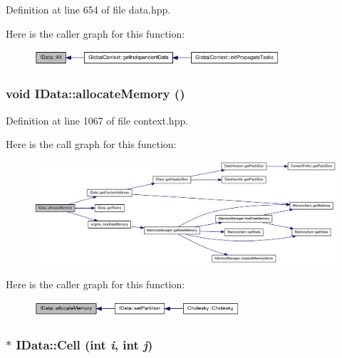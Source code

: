 Definition at line 654 of file data.hpp.

Here is the caller graph for this function:\nopagebreak
\begin{figure}[H]
\begin{center}
\leavevmode
\includegraphics[width=259pt]{class_i_data_aee2a0f1d0d749dc8a2380e4ae5e84c62_icgraph}
\end{center}
\end{figure}
\hypertarget{class_i_data_aa3f5c7ae906943db0780856ba3d53a33}{
\subsubsection[{allocateMemory}]{\setlength{\rightskip}{0pt plus 5cm}void IData::allocateMemory ()}}
\label{class_i_data_aa3f5c7ae906943db0780856ba3d53a33}


Definition at line 1067 of file context.hpp.

Here is the call graph for this function:\nopagebreak
\begin{figure}[H]
\begin{center}
\leavevmode
\includegraphics[width=420pt]{class_i_data_aa3f5c7ae906943db0780856ba3d53a33_cgraph}
\end{center}
\end{figure}


Here is the caller graph for this function:\nopagebreak
\begin{figure}[H]
\begin{center}
\leavevmode
\includegraphics[width=217pt]{class_i_data_aa3f5c7ae906943db0780856ba3d53a33_icgraph}
\end{center}
\end{figure}
\hypertarget{class_i_data_a01298b83fbbb3a79261c7d11b64ba5d1}{
\subsubsection[{Cell}]{$\ast$ IData::Cell (int {\em i}, \/  int {\em j})}}
\label{class_i_data_a01298b83fbbb3a79261c7d11b64ba5d1}


